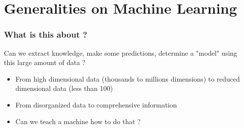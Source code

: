 \documentclass[handout, 10pt]{beamer}
\begin{document}
\section{Generalities on Machine Learning}
\begin{frame}
\frametitle{What is this about ?}
\begin{alertblock}{Can we extract knowledge, make some predictions, determine a "model" using this large
amount of data ?}

\end{alertblock}
\pause
\begin{figure}
\end{figure}
\pause
\begin{itemize}
\item From high dimensional data (thousands to millions dimensions) to reduced dimensional data (less than 100)
\item From disorganized data to comprehensive information
\item \alert{Can we teach a machine how to do that ?}
\end{itemize}

\end{frame}
\end{document}
